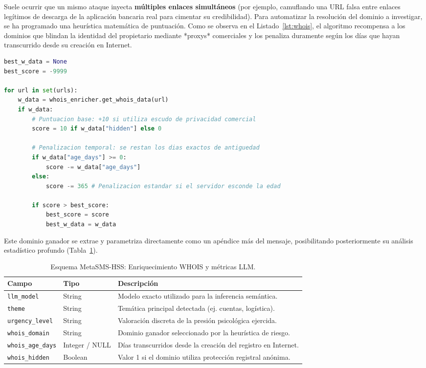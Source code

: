 Suele ocurrir que un mismo ataque inyecta \textbf{múltiples enlaces simultáneos} (por ejemplo, camuflando una URL falsa entre enlaces legítimos de descarga de la aplicación bancaria real para cimentar su credibilidad). Para automatizar la resolución del dominio a investigar, se ha programado una heurística matemática de puntuación. Como se observa en el Listado~\ref{lst:whois}, el algoritmo recompensa a los dominios que blindan la identidad del propietario mediante *proxys* comerciales y los penaliza duramente según los días que hayan transcurrido desde su creación en Internet. 

\begin{lstlisting}[language=Python, caption={Algoritmo heurístico para seleccionar el dominio sospechoso principal en un SMS.}, label=lst:whois]
best_w_data = None
best_score = -9999

for url in set(urls):
    w_data = whois_enricher.get_whois_data(url)
    if w_data:
        # Puntuacion base: +10 si utiliza escudo de privacidad comercial
        score = 10 if w_data["hidden"] else 0
        
        # Penalizacion temporal: se restan los dias exactos de antiguedad
        if w_data["age_days"] >= 0:
            score -= w_data["age_days"]
        else:
            score -= 365 # Penalizacion estandar si el servidor esconde la edad
            
        if score > best_score:
            best_score = score
            best_w_data = w_data
\end{lstlisting}

Este dominio ganador se extrae y parametriza directamente como un apéndice más del mensaje, posibilitando posteriormente su análisis estadístico profundo (Tabla~\ref{tab:esquema_llm}).

\begin{table}[htbp]
    \centering
    \caption{Esquema MetaSMS-HSS: Enriquecimiento WHOIS y métricas LLM.}
    \label{tab:esquema_llm}
    \small
    \begin{tabular}{llp{7cm}}
        \toprule
        \textbf{Campo} & \textbf{Tipo} & \textbf{Descripción} \\
        \midrule
        \texttt{llm\_model} & String & Modelo exacto utilizado para la inferencia semántica. \\
        \texttt{theme} & String & Temática principal detectada (ej. cuentas, logística). \\
        \texttt{urgency\_level} & String & Valoración discreta de la presión psicológica ejercida. \\
        \texttt{whois\_domain} & String & Dominio ganador seleccionado por la heurística de riesgo. \\
        \texttt{whois\_age\_days} & Integer / NULL & Días transcurridos desde la creación del registro en Internet. \\
        \texttt{whois\_hidden} & Boolean & Valor 1 si el dominio utiliza protección registral anónima. \\
        \bottomrule
    \end{tabular}
\end{table}

